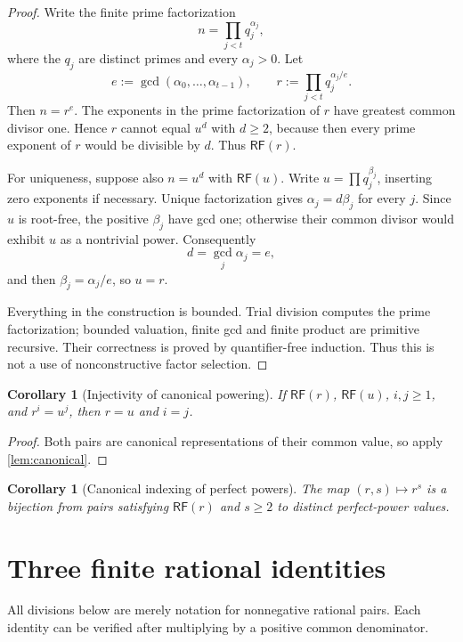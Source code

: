 \documentclass[11pt]{article}
\newtheorem{corollary}[theorem]{Corollary}
\theoremstyle{definition}
\newcommand{\RF}{\mathsf{RF}}
\begin{document}
\begin{proof}
Write the finite prime factorization
\[
  n=\prod_{j<t}q_j^{\alpha_j},
\]
where the $q_j$ are distinct primes and every $\alpha_j>0$.  Let
\[
  e:=\gcd(\alpha_0,\ldots,\alpha_{t-1}),
  \qquad
  r:=\prod_{j<t}q_j^{\alpha_j/e}.
\]
Then $n=r^e$.  The exponents in the prime factorization of $r$ have greatest
common divisor one.  Hence $r$ cannot equal $u^d$ with $d\ge2$, because then
every prime exponent of $r$ would be divisible by $d$.  Thus $\RF(r)$.

For uniqueness, suppose also $n=u^d$ with $\RF(u)$.  Write
$u=\prod q_j^{\beta_j}$, inserting zero exponents if necessary.  Unique
factorization gives $\alpha_j=d\beta_j$ for every $j$.  Since $u$ is root-free,
the positive $\beta_j$ have gcd one; otherwise their common divisor would
exhibit $u$ as a nontrivial power.  Consequently
\[
  d=\gcd_j\alpha_j=e,
\]
and then $\beta_j=\alpha_j/e$, so $u=r$.

Everything in the construction is bounded.  Trial division computes the prime
factorization; bounded valuation, finite gcd and finite product are primitive
recursive.  Their correctness is proved by quantifier-free induction.  Thus
this is not a use of nonconstructive factor selection.
\end{proof}

\begin{corollary}[Injectivity of canonical powering]\label{cor:injective}
If $\RF(r)$, $\RF(u)$, $i,j\ge1$, and $r^i=u^j$, then $r=u$ and $i=j$.
\end{corollary}

\begin{proof}
Both pairs are canonical representations of their common value, so apply
\cref{lem:canonical}.
\end{proof}

\begin{corollary}[Canonical indexing of perfect powers]\label{cor:perfect-bij}
The map $(r,s)\mapsto r^s$ is a bijection from pairs satisfying
$\RF(r)$ and $s\ge2$ to distinct perfect-power values.
\end{corollary}

\section{Three finite rational identities}

All divisions below are merely notation for nonnegative rational pairs.  Each
identity can be verified after multiplying by a positive common denominator.
\end{document}
